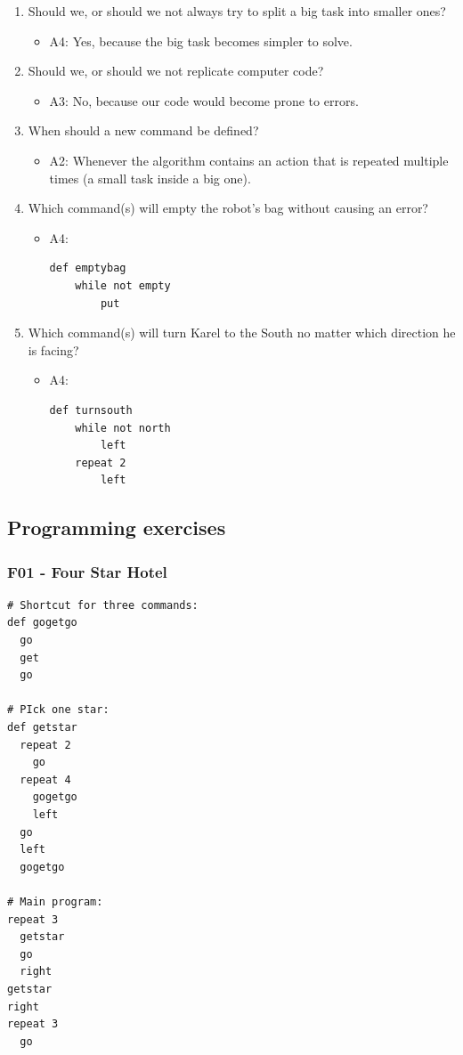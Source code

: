 \documentclass[article,A4,12pt]{llncs}
\begin{document}
\begin{enumerate}
\item Should we, or should we not always try to split a big task into smaller ones?
  \begin{itemize}
    \item A4: Yes, because the big task becomes simpler to solve.
  \end{itemize}
\item Should we, or should we not replicate computer code?
  \begin{itemize}
    \item A3: No, because our code would become prone to errors.
  \end{itemize}
\item When should a new command be defined?
  \begin{itemize}
    \item A2: Whenever the algorithm contains an action that is repeated multiple times
          (a small task inside a big one).
  \end{itemize}
\item Which command(s) will empty the robot's bag without causing an error?
  \begin{itemize}
    \item A4:
\begin{verbatim}
def emptybag
    while not empty
        put
\end{verbatim}
  \end{itemize}
\item Which command(s) will turn Karel to the South no matter 
      which direction he is facing?
  \begin{itemize}
    \item A4:
\begin{verbatim}
def turnsouth
    while not north
        left
    repeat 2
        left
\end{verbatim}
  \end{itemize}
\end{enumerate}


\subsection{Programming exercises}

\subsubsection{F01 - Four Star Hotel}
\begin{verbatim}
# Shortcut for three commands:
def gogetgo
  go
  get
  go

# PIck one star:
def getstar
  repeat 2
    go
  repeat 4
    gogetgo
    left
  go
  left
  gogetgo

# Main program:
repeat 3
  getstar
  go
  right
getstar
right
repeat 3
  go
\end{verbatim}
\end{document}
